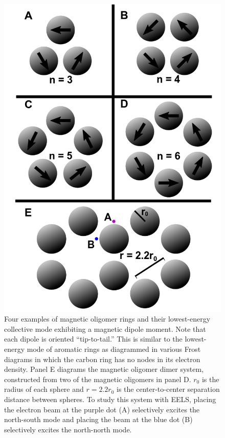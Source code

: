 \documentclass[journal=jpccck,manuscript=article]{achemso}
\begin{document}
\begin{figure}
  \begin{center}
  \includegraphics[trim = 0.5in 0 0.3in 0,clip=true,scale=0.4]{all_the_diagrams.png}
  \caption{Four examples of magnetic oligomer rings and their lowest-energy collective mode exhibiting a magnetic dipole moment. Note that each dipole is oriented ``tip-to-tail.'' This is similar to the lowest-energy mode of aromatic rings as diagrammed in various Frost diagrams in which the carbon ring has no nodes in its electron density. Panel E diagrams the magnetic oligomer dimer system, constructed from two of the magnetic oligomers in panel D. $r_0$ is the radius of each sphere and $r=2.2r_0$ is the center-to-center separation distance between spheres. To study this system with EELS, placing the electron beam at the purple dot (A) selectively excites the north-south mode and placing the beam at the blue dot (B) selectively excites the north-north mode.}
  \label{fig1}
  \end{center}
\end{figure}
\end{document}

